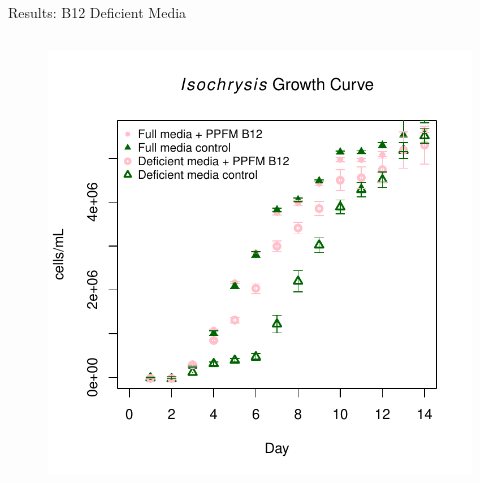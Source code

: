 \documentclass[8pt]{beamer}\usepackage[]{graphicx}\usepackage[]{color}
\begin{document}
\begin{frame}{Results: B12 Deficient Media}
\begin{columns}[t]
\begin{figure}
    \includegraphics[width=1\textwidth]{./figure/ExpD_GrowthCurve1_unlabeled.pdf}
                                \end{figure}
        \end{columns}
\end{frame}
\end{document}
